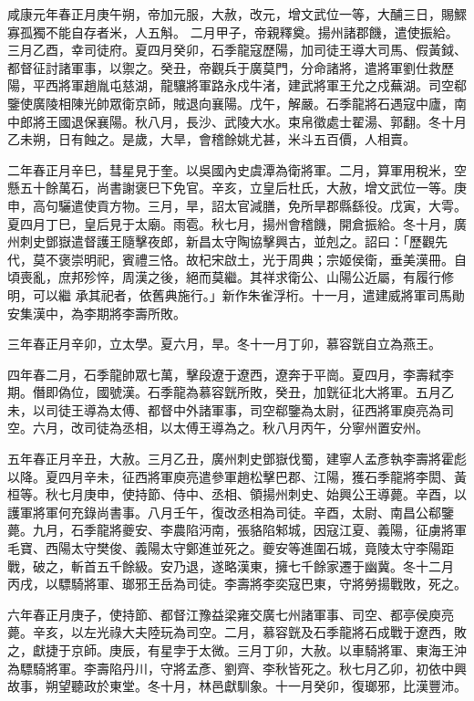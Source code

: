 \begin{pinyinscope}
 咸康元年春正月庚午朔，帝加元服，大赦，改元，增文武位一等，大酺三日，賜鰥寡孤獨不能自存者米，人五斛。
 二月甲子，帝親釋奠。揚州諸郡饑，遣使振給。三月乙酉，幸司徒府。夏四月癸卯，石季龍寇歷陽，加司徒王導大司馬、假黃鉞、都督征討諸軍事，以禦之。癸丑，帝觀兵于廣莫門，分命諸將，遣將軍劉仕救歷陽，平西將軍趙胤屯慈湖，龍驤將軍路永戍牛渚，建武將軍王允之戍蕪湖。司空郗鑒使廣陵相陳光帥眾衛京師，賊退向襄陽。戊午，解嚴。石季龍將石遇寇中廬，南中郎將王國退保襄陽。秋八月，長沙、武陵大水。束帛徵處士翟湯、郭翻。冬十月乙未朔，日有蝕之。是歲，大旱，會稽餘姚尤甚，米斗五百價，人相賣。



 二年春正月辛巳，彗星見于奎。以吳國內史虞潭為衛將軍。二月，算軍用稅米，空懸五十餘萬石，尚書謝褒巳下免官。辛亥，立皇后杜氏，大赦，增文武位一等。庚申，高句驪遣使貢方物。三月，旱，詔太官減膳，免所旱郡縣繇役。戊寅，大雩。夏四月丁巳，皇后見于太廟。雨雹。秋七月，揚州會稽饑，開倉振給。冬十月，廣州刺史鄧嶽遣督護王隨擊夜郎，新昌太守陶協擊興古，並剋之。詔曰：「歷觀先代，莫不褒崇明祀，賓禮三恪。故杞宋啟土，光于周典；宗姬侯衛，垂美漢冊。自頃喪亂，庶邦殄悴，周漢之後，絕而莫繼。其祥求衛公、山陽公近屬，有履行修明，可以繼
 承其祀者，依舊典施行。」新作朱雀浮桁。十一月，遣建威將軍司馬勛安集漢中，為李期將李壽所敗。



 三年春正月辛卯，立太學。夏六月，旱。冬十一月丁卯，慕容皝自立為燕王。



 四年春二月，石季龍帥眾七萬，擊段遼于遼西，遼奔于平崗。夏四月，李壽弒李期。僭即偽位，國號漢。石季龍為慕容皝所敗，癸丑，加皝征北大將軍。五月乙未，以司徒王導為太傅、都督中外諸軍事，司空郗鑒為太尉，征西將軍庾亮為司空。六月，改司徒為丞相，以太傅王導為之。秋八月丙午，分寧州置安州。



 五年春正月辛丑，大赦。三月乙丑，廣州刺史鄧嶽伐蜀，建寧人孟彥執李壽將霍彪以降。夏四月辛未，征西將軍庾亮遣參軍趙松擊巴郡、江陽，獲石季龍將李閎、黃桓等。秋七月庚申，使持節、侍中、丞相、領揚州刺史、始興公王導薨。辛酉，以護軍將軍何充錄尚書事。八月壬午，復改丞相為司徒。辛酉，太尉、南昌公郗鑒薨。九月，石季龍將夔安、李農陷沔南，張貉陷邾城，因寇江夏、義陽，征虜將軍毛寶、西陽太守樊俊、義陽太守鄭進並死之。夔安等進圍石城，竟陵太守李陽距戰，破之，斬首五千餘級。安乃退，遂略漢東，擁七千餘家遷于幽冀。冬十二月
 丙戌，以驃騎將軍、瑯邪王岳為司徒。李壽將李奕寇巴東，守將勞揚戰敗，死之。



 六年春正月庚子，使持節、都督江豫益梁雍交廣七州諸軍事、司空、都亭侯庾亮薨。辛亥，以左光祿大夫陸玩為司空。二月，慕容皝及石季龍將石成戰于遼西，敗之，獻捷于京師。庚辰，有星孛于太微。三月丁卯，大赦。以車騎將軍、東海王沖為驃騎將軍。李壽陷丹川，守將孟彥、劉齊、李秋皆死之。秋七月乙卯，初依中興故事，朔望聽政於東堂。冬十月，林邑獻馴象。十一月癸卯，復瑯邪，比漢豐沛。




\end{pinyinscope}
